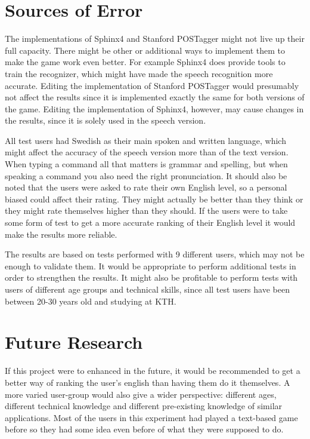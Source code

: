 \section{Sources of Error} %
The implementations of Sphinx4 and Stanford POSTagger might not live up their full capacity. There might be other or additional ways to implement them to make the game work even better. For example Sphinx4 does provide tools to train the recognizer, which might have made the speech recognition more accurate. Editing the implementation of Stanford POSTagger would presumably not affect the results since it is implemented exactly the same for both versions of the game. Editing the implementation of Sphinx4, however, may cause changes in the results, since it is solely used in the speech version.

All test users had Swedish as their main spoken and written language, which might affect the accuracy of the speech version more than of the text version. When typing a command all that matters is grammar and spelling, but when speaking a command you also need the right pronunciation. It should also be noted that the users were asked to rate their own English level, so a personal biased could affect their rating. They might actually be better than they think or they might rate themselves higher than they should. If the users were to take some form of test to get a more accurate ranking of their English level it would make the results more reliable.

The results are based on tests performed with 9 different users, which may not be enough to validate them. It would be appropriate to perform additional tests in order to strengthen the results. It might also be profitable to perform tests with users of different age groups and technical skills, since all test users have been between 20-30 years old and studying at KTH.

\section{Future Research}
If this project were to enhanced in the future, it would be recommended to get a better way of ranking the user's english than having them do it themselves. A more varied user-group would also give a wider perspective: different ages, different technical knowledge and different pre-existing knowledge of similar applications. Most of the users in this experiment had played a text-based game before so they had some idea even before of what they were supposed to do.